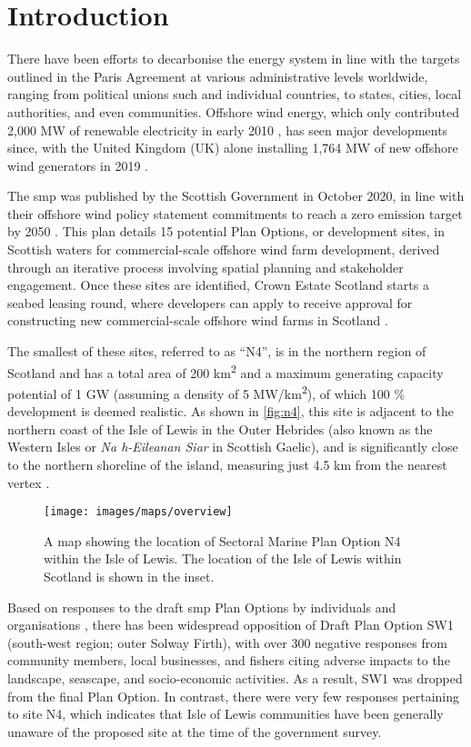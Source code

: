 \chapter{Introduction}

There have been efforts to decarbonise the energy system in line with the
targets outlined in the Paris Agreement at various administrative levels
worldwide, ranging from political unions such and individual countries, to
states, cities, local authorities, and even communities. Offshore wind energy,
which only contributed 2,000 MW of renewable electricity in early 2010
\autocite{esteban2011}, has seen major developments since, with the United
Kingdom (UK) alone installing 1,764 MW of new offshore wind generators in 2019
\autocite{windeurope2020}.

The \gls{smp} was published by the Scottish Government in October 2020, in line
with their offshore wind policy statement commitments to reach a zero emission
target by 2050 \autocite{govscot-smp}. This plan details 15 potential Plan
Options, or development sites, in Scottish waters for commercial-scale offshore
wind farm development, derived through an iterative process involving spatial
planning and stakeholder engagement. Once these sites are identified, Crown
Estate Scotland starts a seabed leasing round, where developers can apply to
receive approval for constructing new commercial-scale offshore wind farms in
Scotland \autocite{crownestate}.

The smallest of these sites, referred to as ``N4'', is in the northern region
of Scotland and has a total area of 200 km\textsuperscript{2} and a maximum
generating capacity potential of 1 GW (assuming a density of 5
MW/km\textsuperscript{2}), of which 100 \% development is deemed realistic. As
shown in \autoref{fig:n4}, this site is adjacent to the northern coast of the
Isle of Lewis in the Outer Hebrides (also known as the Western Isles or
\textit{Na h-Eileanan Siar} in Scottish Gaelic), and is significantly close to
the northern shoreline of the island, measuring just 4.5 km from the nearest
vertex \autocite{naturescot-smp}.

\begin{figure}
  \centering
  \texttt{[image: images/maps/overview]}
  \caption{A map showing the location of Sectoral Marine Plan Option N4 within
  the Isle of Lewis. The location of the Isle of Lewis within Scotland is shown
  in the inset. \label{fig:n4}}
\end{figure}

Based on responses to the draft \gls{smp} Plan Options by individuals and
organisations \autocite{govscot-smpresponses}, there has been widespread
opposition of Draft Plan Option SW1 (south-west region; outer Solway Firth),
with over 300 negative responses \autocite{govscot-smp} from community members,
local businesses, and fishers citing adverse impacts to the landscape,
seascape, and socio-economic activities. As a result, SW1 was dropped from the
final Plan Option. In contrast, there were very few responses pertaining to
site N4, which indicates that Isle of Lewis communities have been generally
unaware of the proposed site at the time of the government survey.

